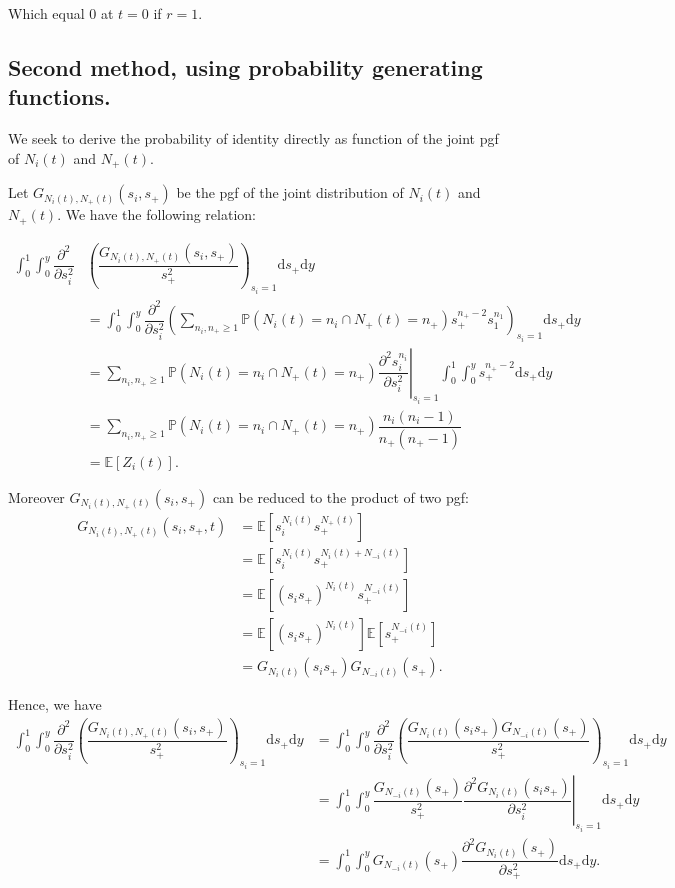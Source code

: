 \documentclass{article}
\newcommand{\ud}{{\mathrm{d}}}
\newcommand{\pr}{{\mathbb{P}}}
\begin{document}
Which equal $0$ at $t=0$ if $r=1$.

 \subsection{Second method, using probability generating functions.}
 We seek to derive the probability of identity directly as function of the joint pgf of $N_i(t)$ and $N_+(t)$.
 
 Let $G_{N_i(t) ,N_+(t)}(s_i,s_+)$ be the pgf of the joint distribution of $N_i(t)$ and $N_+(t)$. We have the following relation:
 
 \begin{align}
 \displaystyle \int_0^1 \int_0^y \dfrac{\partial^2 }{\partial s_i^2} & \left( \dfrac{G_{N_i(t) ,N_+(t)}(s_i,s_+)}{s_+^2} \right)_{s_i =1} \ud s_+ \ud y \\
 &= \int_0^1 \int_0^y \dfrac{\partial^2 }{\partial s_i^2} \left( \sum_{n_i,n_+ \geq 1} \pr(N_i(t)=n_i \cap N_+(t)=n_+) s_+^{n_+ -2} s_1^{n_1} \right)_{s_i =1} \ud s_+ \ud y \\ 
 &= \sum_{n_i,n_+ \geq 1} \pr(N_i(t)=n_i \cap N_+(t)=n_+) \left.  \dfrac{\partial^2 s_i^{n_i}}{\partial s_i^2} \right\vert_{s_i=1} \int_0^1 \int_0^y s_+^{n_+-2} \ud s_+ \ud y\\
 &= \sum_{n_i  ,n_+ \geq 1} \pr(N_i(t)=n_i \cap N_+(t)=n_+) \dfrac{n_i(n_i-1)}{n_+(n_+-1)}\\
 &= \mathbb{E}\left[ Z_i(t) \right].
 \end{align}
 
 Moreover $G_{N_i(t) ,N_+(t)}(s_i,s_+)$ can be reduced to the product of two pgf: 
  \begin{align}
G_{N_i(t) ,N_+(t)}(s_i,s_+,t) &= \mathbb{E} [ s_i^{N_i(t)} s_+^{N_+(t)}] \\
		&= \mathbb{E} [ s_i^{N_i(t)} s_+^{N_i(t)+N_{-i}(t)}]\\
		&= \mathbb{E} [ (s_i s_+)^{N_i(t)} s_+^{N_{-i}(t)}] \\
		&= \mathbb{E} [ (s_i s_+)^{N_i(t)} ]\mathbb{E} [ s_+^{N_{-i}(t)}] \\
		&= G_{N_i(t)}(s_i s_+) G_{N_{-i}(t)}(s_+).
 \end{align}
 
 Hence, we have 
   \begin{align}
\displaystyle \int_0^1 \int_0^y \dfrac{\partial^2 }{\partial s_i^2} \left( \dfrac{G_{N_i(t) ,N_+(t)}(s_i,s_+)}{s_+^2} \right)_{s_i =1} \ud s_+ \ud y
 &= \int_0^1 \int_0^y \dfrac{\partial^2 }{\partial s_i^2} \left( \dfrac{ G_{N_i(t)}(s_i s_+) G_{N_{-i}(t)}(s_+)}{s_+^2} \right)_{s_i =1} \ud s_+ \ud y \\
  &= \int_0^1 \int_0^y \dfrac{G_{N_{-i}(t)}(s_+)}{s_+^2} \left. \dfrac{\partial^2  G_{N_i(t)}(s_i s_+)  }{\partial s_i^2} \right\vert_{s_i =1} \ud s_+ \ud y \\
    &= \int_0^1 \int_0^y G_{N_{-i}(t)}(s_+) \dfrac{\partial^2  G_{N_i(t)}(s_+)  }{\partial s_+^2} \ud s_+ \ud y.
 \end{align}
 
\end{document}
